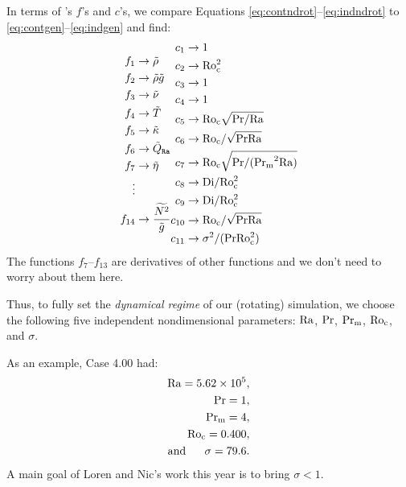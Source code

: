 \documentclass[12pt]{article}
\numberwithin{equation}{section}
\begin{document}
In terms of {\rayleigh}'s $f$'s and $c$'s, we compare Equations \eqref{eq:contndrot}--\eqref{eq:indndrot} to \eqref{eq:contgen}--\eqref{eq:indgen} and find:
\begin{align*}
	\begin{split}
	f_1&\rightarrow \tilde{\rho}\\
	f_2&\rightarrow\tilde{\rho}\tilde{g} \\
	f_3 &\rightarrow \tilde{\nu}\\
	f_4 &\rightarrow \tilde{T}\\
	f_5 &\rightarrow \tilde{\kappa}\\
	f_6 &\rightarrow \tilde{Q}_{\texttt{Ra}}\\
	f_7 &\rightarrow \tilde{\eta}\\
	\vdots\\
	f_{14} &\rightarrow \frac{\widetilde{N^2}}{\tilde{g}}
\end{split}
\begin{split}
c_1 &\rightarrow 1\\
c_2 &\rightarrow {\rm{Ro_c^2}}\\
c_3 &\rightarrow 1\\
c_4 &\rightarrow 1\\
c_5 &\rightarrow {\rm{Ro_c}}\sqrt{{\rm{Pr}}/{\rm{Ra}}}\\
c_6 &\rightarrow {\rm{Ro_c}}/\sqrt{{\rm{Pr}}{\rm{Ra}}}\\
c_7 &\rightarrow {\rm{Ro_c}}\sqrt{{\rm{Pr}}/({\rm{Pr_m}}^2{\rm{Ra}})}\\
c_8 &\rightarrow {\rm{Di}}/{\rm{Ro_c^2}}\\
c_9 &\rightarrow {\rm{Di}}/{\rm{Ro_c^2}}\\
c_{10} &\rightarrow {\rm{Ro_c}}/\sqrt{{\rm{Pr}}{\rm{Ra}}}\\
c_{11} &\rightarrow \sigma^2/({\rm{Pr}}{\rm{Ro_c^2}})
\end{split}
\end{align*}
The functions $f_7$--$f_{13}$ are derivatives of other functions and we don't need to worry about them here. 

Thus, to fully set the \textit{dynamical regime} of our (rotating) simulation, we choose the following five independent nondimensional parameters: ${\rm{Ra}}$, ${\rm{Pr}}$, ${\rm{Pr_m}}$, ${\rm{Ro_c}}$, and $\sigma$. 

As an example, \citealt{Matilsky2024} Case 4.00 had:
\begin{subequations}
	\begin{align}
		{\rm{Ra}}=5.62\times10^{5},\\
		{\rm{Pr}}=1,\\
		{\rm{Pr_m}}=4,\\
		{\rm{Ro_c}}=0.400,\\
	\text{and}\ \ \ \ \ 	\sigma=79.6.
	\end{align}
\end{subequations}
A main goal of Loren and Nic's work this year is to bring $\sigma < 1$. 
\end{document}
